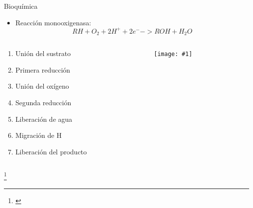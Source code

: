 \documentclass[handout]{beamer}
\newcommand\blfootnote[1]
{%
	\begingroup
	\renewcommand\thefootnote{}\footnote{#1}%
	\addtocounter{footnote}{-1}%
	\endgroup
}
\newcommand{\fcite}[1]{\blfootnote{\cite{#1}}}
\newcommand{\cfigure}[2]
{
	\begin{figure}
		\centering
		\texttt{[image: \#1]}
	\end{figure}
}
\begin{document}
\begin{frame}{Bioqu\'imica}
	\begin{itemize}
		\item Reacción monooxigenasa:
		\begin{equation}
			RH + O_2 + 2H^+ + 2e^- -> ROH + H_2O 
		\end{equation}
	\end{itemize}
	\begin{columns}
		\begin{column}{0.5\textwidth}
			\begin{enumerate}
				\item Unión del sustrato
				\item Primera reducci\'on
				\item Uni\'on del ox\'igeno
				\item Segunda reducci\'on
				\item Liberaci\'on de agua
				\item Migraci\'on de H
				\item Liberaci\'on del producto
			\end{enumerate}
		\end{column}
		\begin{column}{0.5\textwidth}
			\cfigure{sources/P450.png}{0.9\linewidth}
		\end{column}
	\end{columns}
	\fcite{de2005cytochrome}
\end{frame}
\end{document}
